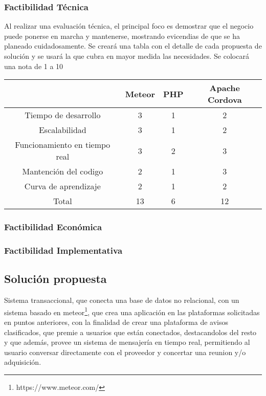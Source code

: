 \documentclass[letterpaper,openright,10pt,twoside]{report}
\begin{document}
				\subsubsection{Factibilidad Técnica}
				Al realizar una evaluación técnica, el principal foco es demostrar que el negocio puede ponerse en marcha y mantenerse, mostrando evicendias de que se ha planeado cuidadosamente. Se creará una tabla con el detalle de cada propuesta de solución y se usará la que cubra en mayor medida las necesidades. Se colocará una nota de 1 a 10
				
				\begin{tabular}{|c|c|c|c|}
\hline
	 & Meteor & PHP & Apache Cordova\\
\hline
	Tiempo de desarrollo 			& 3 & 1 & 2\\
\hline
	Escalabilidad 		 & 3 & 1 & 2\\
\hline
	Funcionamiento en tiempo real & 3 & 2 & 3\\
\hline
	Mantención del codigo & 2 & 1 & 3\\
\hline
	Curva de aprendizaje & 2 & 1 & 2\\
\hline
	Total & 13 & 6 & 12 \\
\hline
\end{tabular}

				
				\subsubsection{Factibilidad Económica}
				\subsubsection{Factibilidad Implementativa}
			\subsection{Solución propuesta}
			
			Sistema transaccional, que conecta una base de datos no relacional, con un sistema basado en meteor\footnote{https://www.meteor.com/}, que crea una aplicación en las plataformas solicitadas en puntos anteriores, con la finalidad de crear una plataforma de avisos clasificados, que premie a usuarios que están conectados, destacandolos del resto y que además, provee un sistema de mensajería en tiempo real, permitiendo al usuario conversar directamente con el proveedor y concertar una reunion y/o adquisición.
				
\end{document}

